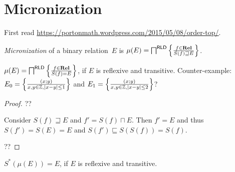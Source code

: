 \chapter{Micronization}

First read \url{https://portonmath.wordpress.com/2015/05/08/order-top/}.

\begin{defn}
\emph{Micronization} of a binary relation~$E$ is
$\mu(E) = \bigsqcap^{\mathsf{RLD}} \left\{ \frac{f\in\mathbf{Rel}}{S(f)\sqsupseteq E}\right\}$.
\end{defn}

\begin{thm}
$\mu(E) = \bigsqcap^{\mathsf{RLD}} \left\{ \frac{f\in\mathbf{Rel}}{S(f)=E}\right\}$, if $E$ is reflexive and transitive.
Counter-example: $E_0=\left\{ \frac{(x;y)}{x,y\in\mathbb{Z}, |x-y|\leq 1}\right\}$ and
$E_1=\left\{ \frac{(x;y)}{x,y\in\mathbb{Z}, |x-y|\leq 2}\right\}$?
\end{thm}

\begin{proof}
??

Consider $S(f)\sqsupseteq E$ and $f'=S(f)\sqcap E$.
Then $f'=E$ and thus $S(f')=S(E)=E$ and $S(f')\sqsubseteq S(S(f))=S(f)$.

??
\end{proof}

\begin{conjecture}
$S^{\ast}(\mu(E)) = E$, if $E$ is reflexive and transitive.
\end{conjecture}
